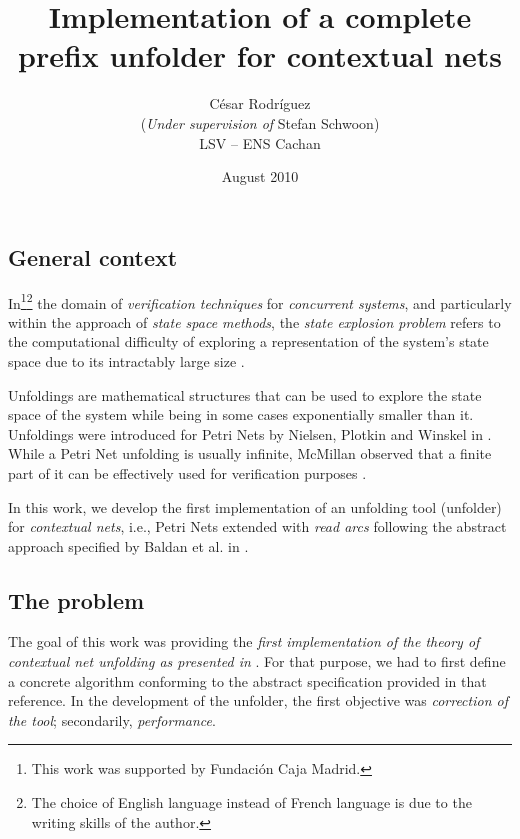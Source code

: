 \documentclass[11pt,a4paper]{article}
\begin{document}

\title{Implementation of a complete prefix unfolder for contextual nets}

\author{César Rodríguez\\[1ex](\textit{Under supervision of} Stefan Schwoon)\\[1em]LSV -- ENS Cachan}
\date{August 2010}

\maketitle
\thispagestyle{empty}

\subsection*{General context}

In\footnote{This work was supported by Fundación Caja Madrid.}\footnote{The
choice of English language instead of French language is due to the writing
skills of the author.} the domain of \emph{verification techniques} for
\emph{concurrent systems}, and particularly within the approach of \emph{state
space methods}, the \emph{state explosion problem} refers to the computational
difficulty of exploring a representation of the system's state space due to its
intractably large size .

Unfoldings are mathematical structures that can be used to explore the state
space of the system while being in some cases exponentially smaller than it.
Unfoldings were introduced for Petri Nets by Nielsen, Plotkin and Winskel in
.  While a Petri Net unfolding is usually infinite, McMillan
observed that a finite part of it can be effectively used for verification
purposes .

In this work, we develop the first implementation of an unfolding tool
(unfolder) for \emph{contextual nets}, i.e., Petri Nets extended with
\emph{read arcs} following the abstract approach specified by Baldan et al. in
.

\subsection*{The problem}

The goal of this work was providing the \emph{first implementation of the
theory of contextual net unfolding as presented in }.  For that
purpose, we had to first define a concrete algorithm conforming to the abstract
specification provided in that reference.  In the development of the unfolder,
the first objective was \emph{correction of the tool}; secondarily,
\emph{performance}.
\end{document}
